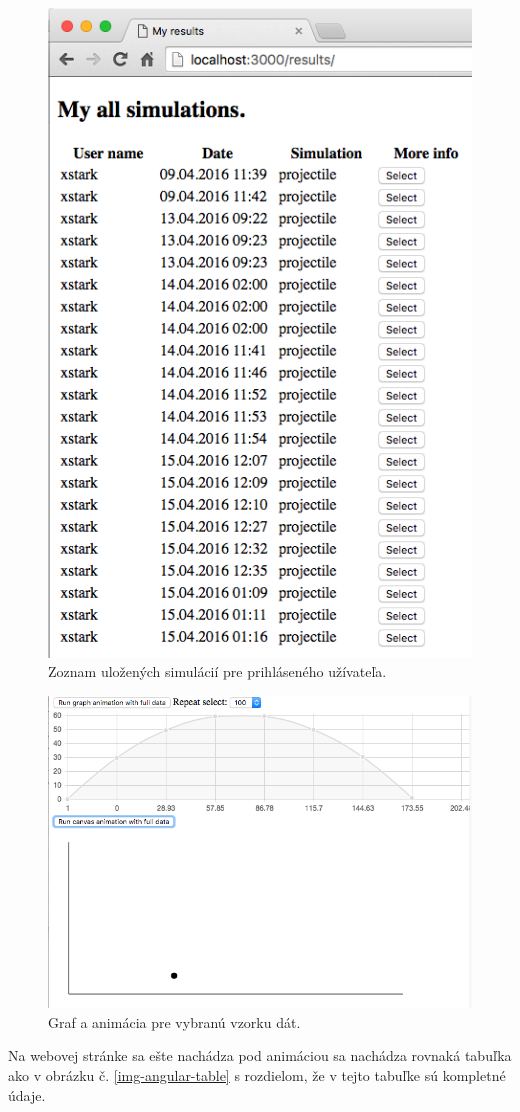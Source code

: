 \begin{figure}[H]
  \centering
  \includegraphics[scale=0.5]{img/code/angular-results-projectile.png}
  \caption{Zoznam uložených simulácií pre prihláseného užívateľa.}
  \label{img-angular-results-projectile}
\end{figure}

\begin{figure}[H]
  \centering
  \includegraphics[scale=0.5]{img/code/angular-fulldata.png}
  \caption{Graf a animácia pre vybranú vzorku dát.}
  \label{img-angular-fulldata}
\end{figure}

Na webovej stránke sa ešte nachádza pod animáciou sa nachádza rovnaká tabuľka ako v obrázku č. \ref{img-angular-table} s rozdielom, že v tejto tabuľke sú kompletné údaje.


